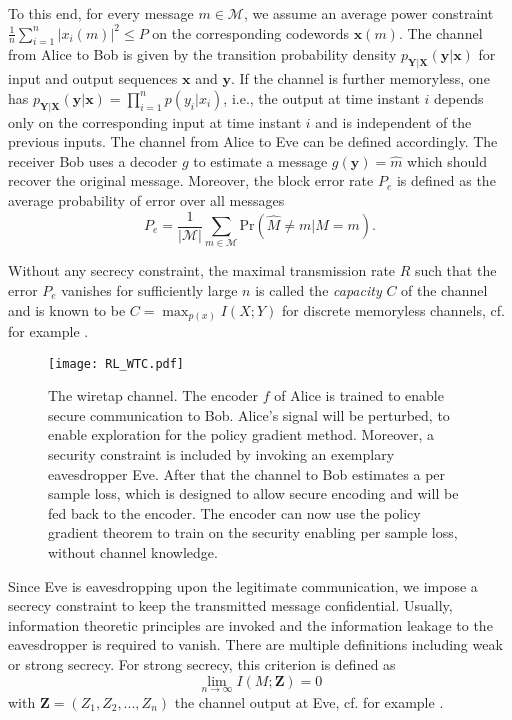 \documentclass[conference, 10pt]{IEEEtran}
\begin{document}
To this end, for every message $m\in\mathcal{M}$, we assume an average power constraint $\tfrac{1}{n}\sum_{i=1}^n|x_i(m)|^2\leq P$ on the corresponding codewords $\mathbf{x}(m)$. The channel from Alice to Bob is given by the transition probability density $p_{\mathbf{Y}|\mathbf{X}}(\mathbf{y}|\mathbf{x})$ for input and output sequences $\mathbf{x}$ and $\mathbf{y}$. If the channel is further memoryless, one has 
$
   p_{\mathbf{Y}|\mathbf{X}}(\mathbf{y}|\mathbf{x})=\prod_{i=1}^{n} p(y_i|x_i)$, i.e., the output at time instant $i$ depends only on the corresponding input at time instant $i$ and is independent of the previous inputs. The channel from Alice to Eve can be defined accordingly.
The receiver Bob uses a decoder $g$ to estimate a message  $g(\mathbf{y})=\hat{m}$ which should recover the original message. Moreover, the block error rate $P_e$ is defined as the average probability of error over all messages
\begin{equation}
    P_e= \frac{1}{|\mathcal{M}|}\sum_{m\in\mathcal{M}} \mbox{Pr}(\hat{M}\neq m | M = m).
\end{equation}

Without any secrecy constraint, the maximal transmission rate $R$ such that the error $P_e$ vanishes for sufficiently large $n$ is called the \emph{capacity} $C$ of the channel and is known to be
$C=\max_{p(x)} I(X;Y)$ for discrete memoryless channels, cf. for example \cite{CoverThomas06ElementsInformationTheory}.

\begin{figure}
    \centering
    \texttt{[image: RL\_WTC.pdf]}
    \caption{The wiretap channel. The encoder $f$ of Alice is trained to enable secure communication to Bob. Alice's signal will be perturbed, to enable exploration for the policy gradient method. Moreover, a security constraint is included by invoking an exemplary eavesdropper Eve. After that the channel to Bob estimates a per sample loss, which is designed to allow secure encoding and will be fed back to the encoder. The encoder can now use the policy gradient theorem to train on the security enabling per sample loss, without channel knowledge.}
    \label{fig:my_label}
\end{figure}

Since Eve is eavesdropping upon the legitimate communication, we impose a secrecy constraint to keep the transmitted message confidential. Usually, information theoretic principles are invoked and the information leakage to the eavesdropper is required to vanish. There are multiple definitions including weak\cite{Wyner75} or strong secrecy\cite{maurer2000strong}. For strong secrecy, this criterion is defined as
\begin{equation}
\lim_{n \rightarrow \infty} I(M;\mathbf{Z})=0
\label{screcy criterion}
\end{equation}
with $\mathbf{Z}=(Z_1,Z_2,...,Z_n)$ the channel output at Eve, cf. for example \cite{BlochBarros-2011-PhysicalLayerSecurity}.
\end{document}
